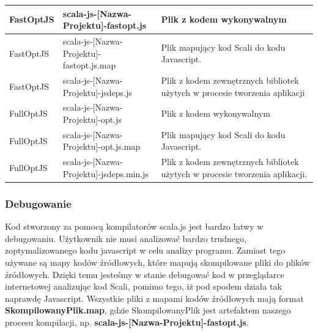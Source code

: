 \begin{center}
\begin{tabular}{| l | l | p{8cm} |}
\hline
FastOptJS & scala-js-[Nazwa-Projektu]-fastopt.js & Plik z kodem wykonywalnym \\ \hline

FastOptJS & scala-js-[Nazwa-Projektu]-fastopt.js.map & Plik mapujący kod Scali do kodu Javascript. \\ \hline

FastOptJS & scala-js-[Nazwa-Projektu]-jsdeps.js & Plik z kodem zewnętrznych bibliotek użytych w procesie tworzenia aplikacji \\ \hline

 \hline \hline

FullOptJS & scala-js-[Nazwa-Projektu]-opt.js & Plik z kodem wykonywalnym \\ \hline

FullOptJS & scala-js-[Nazwa-Projektu]-opt.js.map & Plik mapujący kod Scali do kodu Javascript. \\ \hline

FullOptJS & scala-js-[Nazwa-Projektu]-jsdeps.min.js & Plik z kodem zewnętrznych bibliotek użytych w procesie tworzenia aplikacji. \\ \hline
\hline
\end{tabular}
\end{center}
\subsubsection{Debugowanie}

Kod stworzony za pomocą kompilatorów scala.js jest bardzo łatwy w debugowaniu. Użytkownik nie musi analizować bardzo trudnego, zoptymalizowanego kodu javascript w celu analizy programu. Zamiast tego używane są mapy kodów źródłowych\cite{SourceMapProposal}, które mapują skompilowane pliki do plików źródłowych. Dzięki temu jesteśmy w stanie debugować kod w przeglądarce internetowej analizując kod Scali, pomimo tego, iż pod spodem działa tak naprawdę Javascript.
Wszystkie pliki z mapami kodów źródłowych mają format \textbf{{SkompilowanyPlik}.map}, gdzie SkompilowanyPlik jest artefaktem naszego procesu kompilacji, np.  \textbf{scala-js-[Nazwa-Projektu]-fastopt.js}.

